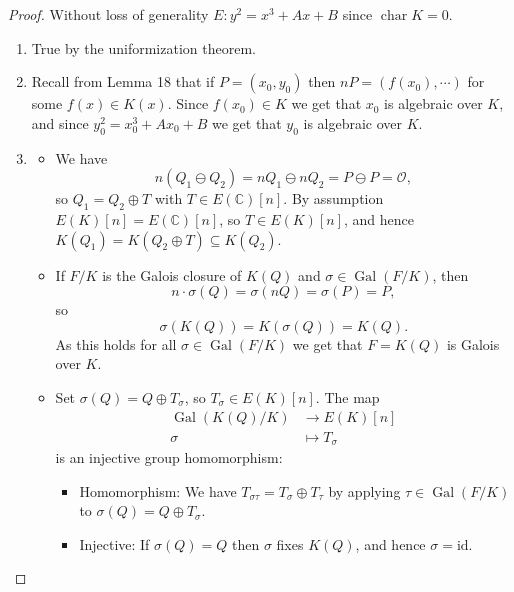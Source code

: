 \documentclass[a4paper]{article}
\theoremstyle{plain}
\theoremstyle{remark}
\theoremstyle{definition}
\DeclareMathOperator{\Gal}{Gal}
\DeclareMathOperator{\ch}{char}
\newcommand{\id}{\mathrm{id}}
\renewcommand{\O}{\mathcal{O}}
\newcommand{\C}{\mathbb{C}}
\begin{document}
\begin{proof}
    Without loss of generality $E:y^2=x^3+Ax+B$ since $\ch K=0$.
    \begin{enumerate}[label=(\roman*)]
        \item True by the uniformization theorem.
        \item Recall from Lemma 18 that if $P=(x_0,y_0)$ then
            $nP=(f(x_0),\cdots)$ for some $f(x)\in K(x)$. Since $f(x_0)\in K$ we
            get that $x_0$ is algebraic over $K$, and since $y_0^2=x_0^3+Ax_0+B$
            we get that $y_0$ is algebraic over $K$.

        \item 
            \begin{itemize}
                \item We have
                    \begin{equation*}
                        n(Q_1\ominus Q_2)=nQ_1\ominus nQ_2=P\ominus P=\O,
                    \end{equation*}
                    so $Q_1=Q_2\oplus T$ with $T\in E(\C)[n]$. By assumption
                    $E(K)[n]=E(\C)[n]$, so $T\in E(K)[n]$, and hence
                    $K(Q_1)=K(Q_2\oplus T)\subseteq K(Q_2)$.

                \item If $F/K$ is the Galois closure of $K(Q)$ and
                    $\sigma\in\Gal(F/K)$, then
                    \begin{equation*}
                        n\cdot\sigma(Q) = \sigma(nQ) = \sigma(P) = P,
                    \end{equation*}
                    so
                    \begin{equation*}
                        \sigma(K(Q)) = K(\sigma(Q)) = K(Q).
                    \end{equation*}
                    As this holds for all $\sigma\in\Gal(F/K)$ we get that
                    $F=K(Q)$ is Galois over $K$.

                \item Set $\sigma(Q)=Q\oplus T_\sigma$, so
                    $T_\sigma\in E(K)[n]$. The map
                    \begin{align*}
                        \Gal(K(Q)/K) &\to E(K)[n] \\
                        \sigma &\mapsto T_\sigma
                    \end{align*}
                    is an injective group homomorphism:
                    \begin{itemize}
                        \item Homomorphism: We have
                            $T_{\sigma\tau}=T_\sigma\oplus T_\tau$ by applying
                            $\tau\in\Gal(F/K)$ to $\sigma(Q)=Q\oplus T_\sigma$.

                        \item Injective: If $\sigma(Q)=Q$ then $\sigma$ fixes
                            $K(Q)$, and hence $\sigma=\id$.
                    \end{itemize}
            \end{itemize}
    \end{enumerate}
\end{proof}
\end{document}
